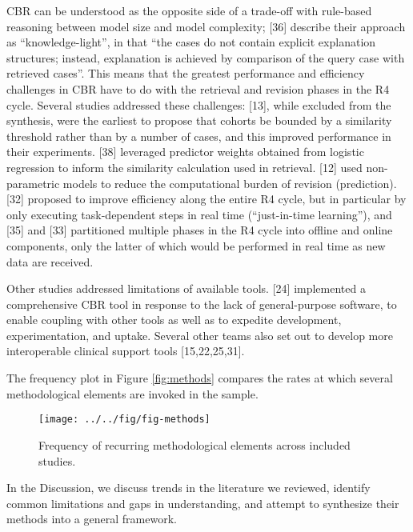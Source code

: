 \documentclass[preprint, 3p,
authoryear]{elsarticle} %
\begin{document}
CBR can be understood as the opposite side of a trade-off with
rule-based reasoning between model size and model complexity; {[}36{]}
describe their approach as ``knowledge-light'', in that ``the cases do
not contain explicit explanation structures; instead, explanation is
achieved by comparison of the query case with retrieved cases''. This
means that the greatest performance and efficiency challenges in CBR
have to do with the retrieval and revision phases in the R4 cycle.
Several studies addressed these challenges: {[}13{]}, while excluded
from the synthesis, were the earliest to propose that cohorts be bounded
by a similarity threshold rather than by a number of cases, and this
improved performance in their experiments. {[}38{]} leveraged predictor
weights obtained from logistic regression to inform the similarity
calculation used in retrieval. {[}12{]} used non-parametric models to
reduce the computational burden of revision (prediction). {[}32{]}
proposed to improve efficiency along the entire R4 cycle, but in
particular by only executing task-dependent steps in real time
(``just-in-time learning''), and {[}35{]} and {[}33{]} partitioned
multiple phases in the R4 cycle into offline and online components, only
the latter of which would be performed in real time as new data are
received.

Other studies addressed limitations of available tools. {[}24{]}
implemented a comprehensive CBR tool in response to the lack of
general-purpose software, to enable coupling with other tools as well as
to expedite development, experimentation, and uptake. Several other
teams also set out to develop more interoperable clinical support tools
{[}15,22,25,31{]}.

The frequency plot in Figure \ref{fig:methods} compares the rates at
which several methodological elements are invoked in the sample.

\begin{figure}

{\centering \texttt{[image: ../../fig/fig-methods]} 

}

\caption{\label{fig:methods}Frequency of recurring methodological elements across included studies.}\label{fig:fig:methods}
\end{figure}

In the Discussion, we discuss trends in the literature we reviewed,
identify common limitations and gaps in understanding, and attempt to
synthesize their methods into a general framework.
\end{document}
